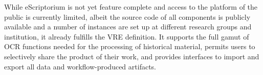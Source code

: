 While eScriptorium is not yet feature complete and access to the platform of
the public is currently limited, albeit the source code of all components is
publicly available and a number of instances are set up at different research
groups and institution, it already fulfills the VRE definition. It supports the
full gamut of OCR functions needed for the processing of historical material,
permits users to selectively share the product of their work, and provides
interfaces to import and export all data and workflow-produced artifacts.

\printbibliography[heading=subbibliography]
\endrefsection
